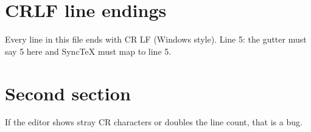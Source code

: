 \documentclass{article}
\begin{document}
\section{CRLF line endings}
Every line in this file ends with CR LF (Windows style).
Line 5: the gutter must say 5 here and SyncTeX must map to line 5.

\section{Second section}
If the editor shows stray CR characters or doubles the line count, that is a bug.
\end{document}
